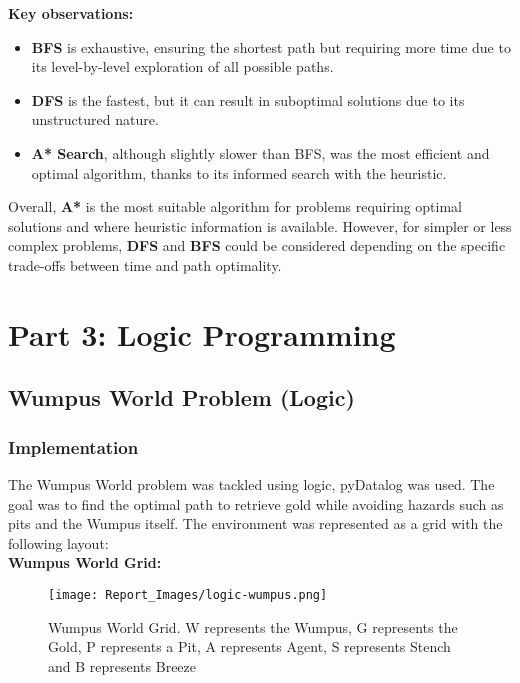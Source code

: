 \documentclass[12pt]{article}
\begin{document}
\textbf{Key observations:}
\begin{itemize}
    \item \textbf{BFS} is exhaustive, ensuring the shortest path but requiring more time due to its level-by-level exploration of all possible paths.
    \item \textbf{DFS} is the fastest, but it can result in suboptimal solutions due to its unstructured nature.
    \item \textbf{A* Search}, although slightly slower than BFS, was the most efficient and optimal algorithm, thanks to its informed search with the heuristic.
\end{itemize}

Overall, \textbf{A*} is the most suitable algorithm for problems requiring optimal solutions and where heuristic information is available. However, for simpler or less complex problems, \textbf{DFS} and \textbf{BFS} could be considered depending on the specific trade-offs between time and path optimality.



\newpage
\section{Part 3: Logic Programming}

\subsection{Wumpus World Problem (Logic)}
\subsubsection{Implementation}
The Wumpus World problem was tackled using logic, pyDatalog was used. The goal was to find the optimal path to retrieve gold while avoiding hazards such as pits and the Wumpus itself. The environment was represented as a grid with the following layout:\\

\textbf{Wumpus World Grid:}
\begin{figure}[h!]
    \centering
    \texttt{[image: Report\_Images/logic-wumpus.png]} %
    \caption{Wumpus World Grid. W represents the Wumpus, G represents the Gold, P represents a Pit, A represents Agent, S represents Stench and B represents Breeze}
    \label{fig:wumpus_world_grid}
\end{figure}
\end{document}
